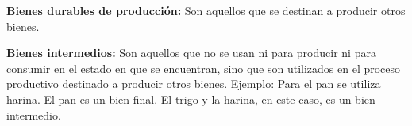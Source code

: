\textbf{Bienes durables de producción:} Son aquellos que se destinan a producir otros bienes.

\textbf{Bienes intermedios:}
Son aquellos que no se usan ni para producir ni para consumir
en el estado en que se encuentran,
sino que son utilizados en el proceso productivo
destinado a producir otros bienes.
Ejemplo:
Para el pan se utiliza harina.
El pan es un bien final.
El trigo y la harina,
en este caso,
es un bien intermedio.